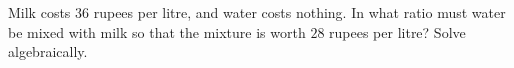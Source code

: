 Milk costs $36$ rupees per litre, and water costs nothing. In what ratio must water be mixed with milk so that the mixture is worth $28$ rupees per litre? Solve algebraically.

